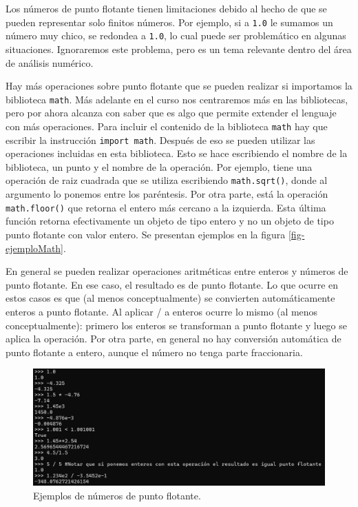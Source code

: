 \documentclass[a4paper, 12pt]{report}
\theoremstyle{definition}
\begin{document}
Los números de punto flotante tienen limitaciones debido al hecho de que se pueden representar solo finitos números. Por ejemplo, si a {\tt 1.0} le sumamos un número muy chico, se redondea a {\tt 1.0}, lo cual puede ser problemático en algunas situaciones. Ignoraremos este problema, pero es un tema relevante dentro del área de análisis numérico.

Hay más operaciones sobre punto flotante que se pueden realizar si importamos la biblioteca {\tt math}. Más adelante en el curso nos centraremos más en las bibliotecas, pero por ahora alcanza con saber que es algo que permite extender el lenguaje con más operaciones. Para incluir el contenido de la biblioteca {\tt math} hay que escribir la instrucción {\tt import math}. Después de eso se pueden utilizar las operaciones incluidas en esta biblioteca. Esto se hace escribiendo el nombre de la biblioteca, un punto y el nombre de la operación. Por ejemplo, tiene una operación de raiz cuadrada que se utiliza escribiendo {\tt math.sqrt()}, donde al argumento lo ponemos entre los paréntesis. Por otra parte, está la operación {\tt math.floor()} que retorna el entero más cercano a la izquierda. Esta última función retorna efectivamente un objeto de tipo entero y no un objeto de tipo punto flotante con valor entero. Se presentan ejemplos en la figura \ref{fig-ejemploMath}.

En general se pueden realizar operaciones aritméticas entre enteros y números de punto flotante. En ese caso, el resultado es de punto flotante. Lo que ocurre en estos casos es que (al menos conceptualmente) se convierten automáticamente enteros a punto flotante. Al aplicar / a enteros ocurre lo mismo (al menos conceptualmente): primero los enteros se transforman a punto flotante y luego se aplica la operación. Por otra parte, en general no hay conversión automática de punto flotante a entero, aunque el número no tenga parte fraccionaria.

\begin{figure}
	\centering
	\includegraphics[scale=0.6]{ejemploFloat.png}
	\caption{Ejemplos de números de punto flotante.}
	\label{fig-ejemploFloat}
\end{figure}
\end{document}
